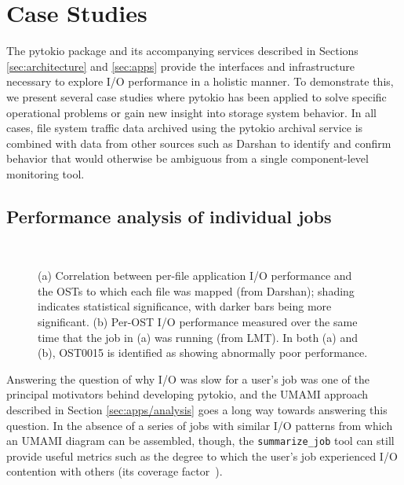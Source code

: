 \section{Case Studies}
\label{sec:results}

The pytokio package and its accompanying services described in Sections \ref{sec:architecture} and \ref{sec:apps} provide the interfaces and infrastructure necessary to explore I/O performance in a holistic manner.
To demonstrate this, we present several case studies where pytokio has been applied to solve specific operational problems or gain new insight into storage system behavior.
In all cases, file system traffic data archived using the pytokio archival service is combined with data from other sources such as Darshan to identify and confirm behavior that would otherwise be ambiguous from a single component-level monitoring tool.

\subsection{Performance analysis of individual jobs} \label{sec:results/users}

\begin{figure}
    \centering
    \\

    \caption{%
    (a) Correlation between per-file application I/O performance and the OSTs to which each file was mapped (from Darshan); shading indicates statistical significance, with darker bars being more significant.
    (b) Per-OST I/O performance measured over the same time that the job in (a) was running (from LMT).
    In both (a) and (b), OST0015 is identified as showing abnormally poor performance.
    }
    \label{fig:straggling-ost}
    \vspace{-.2in}
\end{figure}

Answering the question of why I/O was slow for a user's job was one of the principal motivators behind developing pytokio, and the UMAMI approach described in Section \ref{sec:apps/analysis} goes a long way towards answering this question.
In the absence of a series of jobs with similar I/O patterns from which an UMAMI diagram can be assembled, though, the \texttt{summarize\_job} tool can still provide useful metrics such as the degree to which the user's job experienced I/O contention with others (its coverage factor~\cite{Lockwood2017}).

